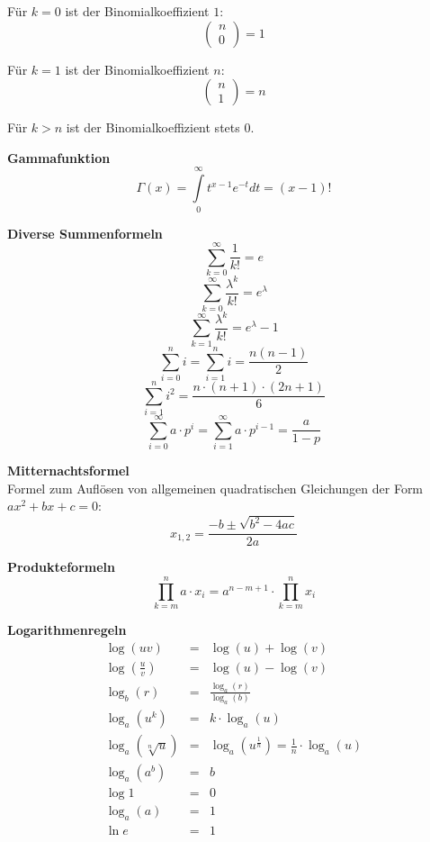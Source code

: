 \documentclass[10pt,a4paper,twocolumn]{article}
\begin{document}
\vspace{10pt}

Für $k=0$ ist der Binomialkoeffizient $1$:
\[
\left(
\begin{array}{c}
	n \\
	0
\end{array}
\right)=1
\]

Für $k=1$ ist der Binomialkoeffizient $n$:
\[
\left(
\begin{array}{c}
	n \\
	1
\end{array}
\right)=n
\]

Für $k>n$ ist der Binomialkoeffizient stets $0$.

\vspace{10pt}

\textbf{Gammafunktion}
\[
\Gamma(x) = \int\limits_{0}^{\infty}t^{x-1}e^{-t}dt=(x-1)!
\]

\vspace{10pt}

\textbf{Diverse Summenformeln}
\[
\sum\limits_{k=0}^{\infty}\frac{1}{k!}=e
\]
\[
\sum\limits_{k=0}^{\infty}\frac{\lambda^k}{k!}=e^{\lambda}
\]
\[
\sum\limits_{k=1}^{\infty}\frac{\lambda^k}{k!}=e^{\lambda}-1
\]
\[
\sum\limits_{i=0}^{n}i=\sum\limits_{i=1}^{n}i=\frac{n(n-1)}{2}
\]
\[
\sum\limits_{i=1}^{n}i^2=\frac{n\cdot (n+1)\cdot (2n+1)}{6}
\]
\[
\sum\limits_{i=0}^{\infty}a\cdot p^i=\sum\limits_{i=1}^{\infty}a\cdot p^{i-1}=\frac{a}{1-p}
\]

\vspace{10pt}

\textbf{Mitternachtsformel} \\
Formel zum Auflösen von allgemeinen quadratischen Gleichungen der Form $ax^2+bx+c=0$:
\[
x_{1,2} = \frac{-b\pm\sqrt{b^2-4ac}}{2a} 
\]

\textbf{Produkteformeln}
\[
\prod\limits_{k=m}^{n}a\cdot x_i = a^{n-m+1}\cdot\prod\limits_{k=m}^{n}x_i
\]

\vspace{10pt}

\textbf{Logarithmenregeln}
\[
\begin{array}{rcl}
	\log{(uv)} & = & \log{(u)}+\log{(v)} \\
	\log{(\frac{u}{v})} & = & \log{(u)}-\log{(v)} \\
	\log_b{(r)} & = & \frac{\log_a(r)}{\log_a{(b)}} \\
	\log_a{(u^k)} & = & k\cdot\log_a{(u)} \\
	\log_a{(\sqrt[n]{u})} & = & \log_a{(u^{\frac{1}{n}})}=\frac{1}{n}\cdot\log_a{(u)} \\
	\log_a{(a^b)} & = & b \\ 
	\log{1} & = & 0 \\
	\log_a{(a)} & = & 1 \\	
	\ln{e} & = & 1 \\
		
\end{array}
\]
\end{document}
